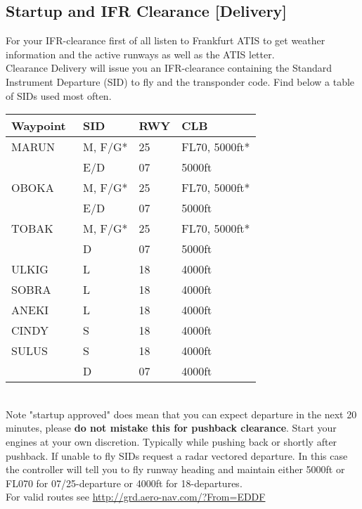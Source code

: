 \subsection[DEL]{Startup and IFR Clearance [Delivery]}
For your IFR-clearance first of all listen to Frankfurt ATIS to
get weather information and the active runways as well as
the ATIS letter.\\
Clearance Delivery will issue you an IFR-clearance containing the Standard Instrument Departure (SID) to fly and the transponder code. Find below a table of SIDs used most often.\\
\begin{table}[h]
	\begin{tabular}{|l|l|l|l|}
		\hline
		\textbf{Waypoint} & \textbf{SID}  & \textbf{RWY} & \textbf{CLB}\\\hline
		MARUN    & M, F/G*	& 25 & FL70, 5000ft*	\\
				 & E/D		& 07 & 5000ft   	\\\hline
		OBOKA    & M, F/G*	& 25 & FL70, 5000ft* \\
				 & E/D		& 07 & 5000ft   	\\\hline
		TOBAK    & M, F/G*	& 25 & FL70, 5000ft*	\\
				 & D		& 07 & 5000ft   	\\\hline
		ULKIG    & L   		& 18 & 4000ft 		\\\hline
		SOBRA    & L    	& 18 & 4000ft 		\\\hline
		ANEKI    & L    	& 18 & 4000ft 		\\\hline
		CINDY    & S    	& 18 & 4000ft 		\\\hline
		SULUS    & S    	& 18 & 4000ft  		\\
				 & D    	& 07 & 4000ft 		\\
		\hline
	\end{tabular}
\end{table}
\\
Note "startup approved" does mean that you can expect departure in the next 20 minutes, please \textbf{do not mistake this for pushback clearance}. Start your engines at your own discretion. Typically while pushing back or shortly after
pushback.
If unable to fly SIDs request a radar vectored departure. In this case the controller will tell you to fly runway heading and maintain either 5000ft or FL070 for 07/25-departure or 4000ft for 18-departures.\\
For valid routes see \url{http://grd.aero-nav.com/?From=EDDF}

